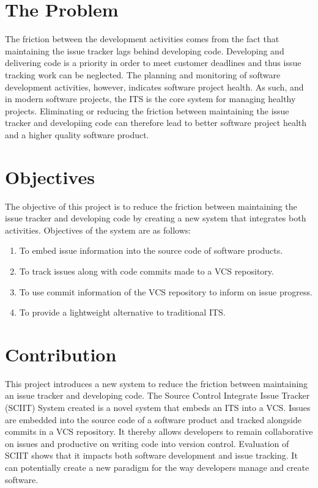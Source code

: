 \documentclass{mproj}
\begin{document}
\section{The Problem}

The friction between the development activities comes from the fact that maintaining the issue tracker lags behind developing code. Developing and delivering code is a priority in order to meet customer deadlines and thus issue tracking work can be neglected. The planning and monitoring of software development activities, however, indicates software project health. As such, and in modern software projects, the ITS is the core system for managing healthy projects. Eliminating or reducing the friction between maintaining the issue tracker and developiing code can therefore lead to better software project health and a higher quality software product.



\section{Objectives}

The objective of this project is to reduce the friction between maintaining the issue tracker and developing code by creating a new system that integrates both activities. Objectives of the system are as follows:

\begin{enumerate}
  \item To embed issue information into the source code of software products.
  \item To track issues along with code commits made to a VCS repository.
  \item To use commit information of the VCS repository to inform on issue progress.
  \item To provide a lightweight alternative to traditional ITS.
\end{enumerate}


\section{Contribution}

This project introduces a new system to reduce the friction between maintaining an issue tracker and developing code. The Source Control Integrate Issue Tracker (SCIIT) System created is a novel system that embeds an ITS into a VCS. Issues are embedded into the source code of a software product and tracked alongside commits in a VCS repository. It thereby allows developers to remain collaborative on issues and productive on writing code into version control. Evaluation of SCIIT shows that it impacts both software development and issue tracking. It can potentially create a new paradigm for the way developers manage and create software.
\end{document}
